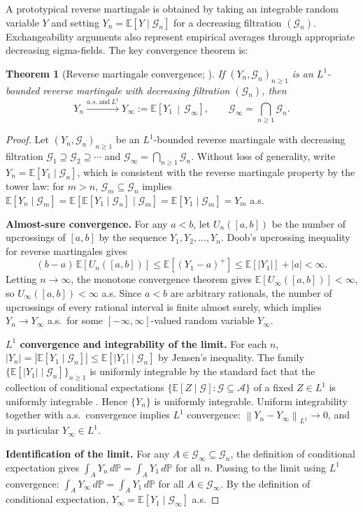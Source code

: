 \documentclass[bj,authoryear]{imsart}
\theoremstyle{plain}
\newtheorem{theorem}{Theorem}[section]
\theoremstyle{definition}
\newcommand{\E}{\mathbb{E}}
\newcommand{\Prob}{\mathbb{P}}
\newcommand{\G}{\mathcal{G}}
\newcommand{\A}{\mathcal{A}}
\newcommand{\norm}[1]{\left\lVert #1 \right\rVert}
\newcommand{\given}{\mid}
\begin{document}
A prototypical reverse martingale is obtained by taking an integrable random
variable $Y$ and setting $Y_n=\E[Y\mid\G_n]$ for a decreasing filtration
$(\G_n)$.  Exchangeability arguments also represent empirical averages through
appropriate decreasing sigma-fields.  The key convergence theorem is:

\begin{theorem}[Reverse martingale convergence; \citealt{doob1953stochastic}]
\label{thm:revmg}
  If $(Y_n, \G_n)_{n\geq 1}$ is an $L^1$-bounded reverse martingale with
  decreasing filtration $(\G_n)$, then
  \[
    Y_n \xrightarrow{a.s.\ \text{and}\ L^1}
    Y_\infty := \E\!\left[Y_1 \,\middle|\, \G_\infty\right],
    \qquad \G_\infty = \bigcap_{n \geq 1} \G_n.
  \]
\end{theorem}

\begin{proof}
  Let $(Y_n, \G_n)_{n\geq 1}$ be an $L^1$-bounded reverse martingale
  with decreasing filtration $\G_1 \supseteq \G_2 \supseteq \cdots$
  and $\G_\infty = \bigcap_{n\geq 1}\G_n$.
  Without loss of generality, write $Y_n = \E[Y_1\given\G_n]$, which is
  consistent with the reverse martingale property by the tower law:
  for $m > n$, $\G_m \subseteq \G_n$ implies
  $\E[Y_n\given\G_m] = \E[\E[Y_1\given\G_n]\given\G_m]
   = \E[Y_1\given\G_m] = Y_m$ a.s.

  \textbf{Almost-sure convergence.}
  For any $a < b$, let $U_n([a,b])$ be the number of upcrossings of
  $[a,b]$ by the sequence $Y_1, Y_2, \ldots, Y_n$.
  Doob's upcrossing inequality for reverse martingales
  \citep[Chapter~V]{neveu1975discrete} gives
  \[
    (b-a)\,\E[U_n([a,b])] \leq \E[(Y_1 - a)^+] \leq \E[|Y_1|] + |a| < \infty.
  \]
  Letting $n\to\infty$, the monotone convergence theorem gives
  $\E[U_\infty([a,b])] < \infty$, so $U_\infty([a,b]) < \infty$ a.s.
  Since $a < b$ are arbitrary rationals, the number of upcrossings of
  every rational interval is finite almost surely, which implies
  $Y_n \to Y_\infty$ a.s.\ for some $[-\infty,\infty]$-valued random
  variable $Y_\infty$.

  \textbf{$L^1$ convergence and integrability of the limit.}
  For each $n$, $|Y_n| = |\E[Y_1\given\G_n]| \leq \E[|Y_1|\given\G_n]$
  by Jensen's inequality.  The family $\{\E[|Y_1|\given\G_n]\}_{n\geq 1}$
  is uniformly integrable by the standard fact that the collection of
  conditional expectations $\{\E[Z\given\G] : \G \subseteq \A\}$ of a
  fixed $Z \in L^1$ is uniformly integrable
  \citep[Sec.~13.4]{williams1991probability}.
  Hence $\{Y_n\}$ is uniformly integrable.
  Uniform integrability together with a.s.\ convergence implies $L^1$
  convergence: $\norm{Y_n - Y_\infty}_{L^1} \to 0$, and in particular
  $Y_\infty \in L^1$.

  \textbf{Identification of the limit.}
  For any $A \in \G_\infty \subseteq \G_n$, the definition of conditional
  expectation gives $\int_A Y_n\,d\Prob = \int_A Y_1\,d\Prob$ for all
  $n$.  Passing to the limit using $L^1$ convergence:
  $\int_A Y_\infty\,d\Prob = \int_A Y_1\,d\Prob$ for all $A\in\G_\infty$.
  By the definition of conditional expectation,
  $Y_\infty = \E[Y_1\given\G_\infty]$ a.s.
\end{proof}
\end{document}
